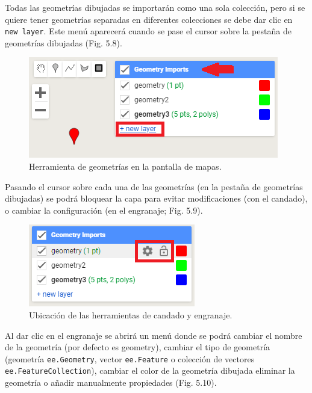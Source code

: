 \documentclass[
  12pt,
  letterpaper,
  twoside]{book}
\begin{document}
Todas las geometrías dibujadas se importarán como una sola colección, pero si se quiere tener geometrías separadas en diferentes colecciones se debe dar clic en \texttt{new\ layer}. Este menú aparecerá cuando se pase el cursor sobre la pestaña de geometrías dibujadas (Fig. 5.8).

\begin{figure}[btp]

{\centering \includegraphics[width=0.6\linewidth]{Img/nuevaGeo} 

}

\caption{Herramienta de geometrías en la pantalla de mapas.}\label{fig:unnamed-chunk-60}
\end{figure}

Pasando el cursor sobre cada una de las geometrías (en la pestaña de geometrías dibujadas) se podrá bloquear la capa para evitar modificaciones (con el candado), o cambiar la configuración (en el engranaje; Fig. 5.9).

\begin{figure}[btp]

{\centering \includegraphics[width=0.4\linewidth]{Img/dibujarGeo} 

}

\caption{Ubicación de las herramientas de candado y engranaje.}\label{fig:unnamed-chunk-61}
\end{figure}

Al dar clic en el engranaje se abrirá un menú donde se podrá cambiar el nombre de la geometría (por defecto es geometry), cambiar el tipo de geometría (geometría \texttt{ee.Geometry}, vector \texttt{ee.Feature} o colección de vectores \texttt{ee.FeatureCollection}), cambiar el color de la geometría dibujada eliminar la geometría o añadir manualmente propiedades (Fig. 5.10).
\end{document}

